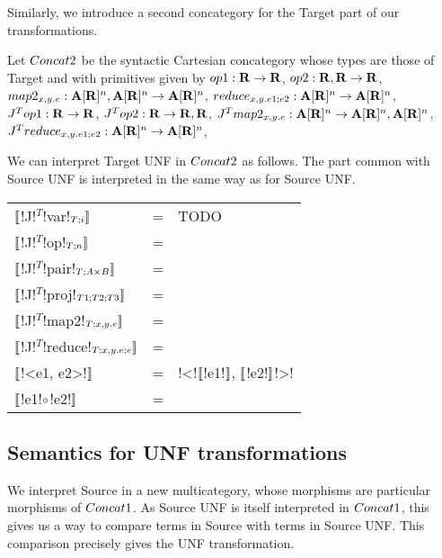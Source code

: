 Similarly, we introduce a second concategory for the Target part of our transformations.

\begin{definition}[$\ConcatT$]
Let $\ConcatT$ be the syntactic Cartesian concategory whose types are those of Target and 
with primitives given by 
$op1: \mathbf{R} \to \mathbf{R}$, 
$op2: \mathbf{R},\mathbf{R} \to \mathbf{R}$, 
$map2_{x,y.e}: \mathbf{A}[\mathbf{R}]^{n},\mathbf{A}[\mathbf{R}]^{n}\to \mathbf{A}[\mathbf{R}]^{n}$, 
$reduce_{x,y.e1;e2}: \mathbf{A}[\mathbf{R}]^{n} \to \mathbf{A}[\mathbf{R}]^{n}$, 
$J^Top1: \mathbf{R} \to \mathbf{R}$, 
$J^Top2: \mathbf{R} \to \mathbf{R}, \mathbf{R}$, 
$J^Tmap2_{x,y.e}: \mathbf{A}[\mathbf{R}]^{n} \to \mathbf{A}[\mathbf{R}]^{n}, \mathbf{A}[\mathbf{R}]^{n}$, 
$J^Treduce_{x,y.e1;e2}: \mathbf{A}[\mathbf{R}]^{n} \to \mathbf{A}[\mathbf{R}]^{n}$, 
\end{definition}

We can interpret Target UNF in $\ConcatT$ as follows. 
The part common with Source UNF is interpreted in the same way as for Source UNF.


\begin{tabular}{l c l}
    $\llbracket$!J!$^T$!var!$_{T;i} \rrbracket$ &=& TODO \\
    $\llbracket$!J!$^T$!op!$_{T;n} \rrbracket$ &=&  \\
    $\llbracket$!J!$^T$!pair!$_{T;A\times B} \rrbracket$ &=& \\
    $\llbracket$!J!$^T$!proj!$_{T1;T2;T3} \rrbracket$ &=& \\
    $\llbracket$!J!$^T$!map2!$_{T;x,y.e}\rrbracket$  &=& \\
    $\llbracket$!J!$^T$!reduce!$_{T;x,y.e;e}\rrbracket$  &=& \\
    $\llbracket$!<e1, e2>!$\rrbracket$  &=& !<!$\llbracket$!e1!$\rrbracket$, $\llbracket$!e2!$\rrbracket$!>! \\
    $\llbracket$!e1!$\circ$!e2!$\rrbracket$ &=&  \\
 \end{tabular}

\subsection{Semantics for UNF transformations} %
\label{sub:Semantics for UNF transformations}

We interpret Source in a new multicategory, 
whose morphisms are particular morphisms of $Concat1$.
As Source UNF is itself interpreted in $Concat1$, 
this gives us a way to compare terms in Source with terms in Source UNF.
This comparison precisely gives the UNF transformation.

